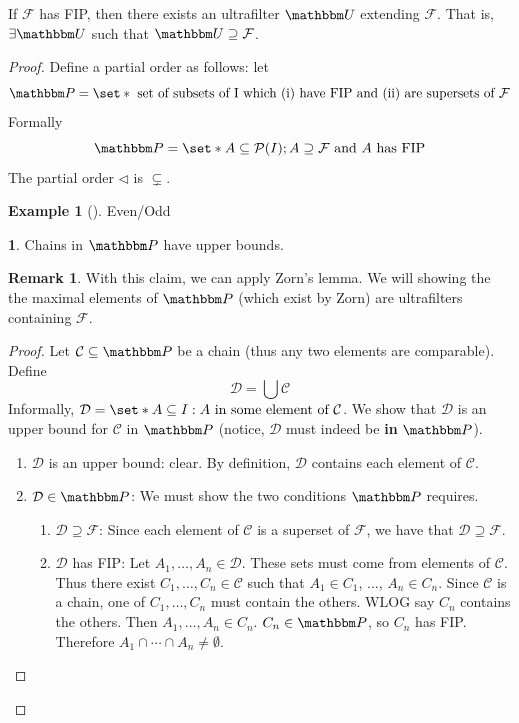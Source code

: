 \documentclass[11pt]{article}
\numberwithin{equation}{section}
\newcounter{theo}[section]\setcounter{theo}{0}
\theoremstyle{definition}
\newtheorem{claim}{\color{ForestGreen}{\textbf{Claim}}}[section]
\theoremstyle{definition}
\newtheorem{example}{\color{WildStrawberry}Example}[section]
\newtheorem*{remark}{Remark}
\def\Set{\set*}%
\def\sse{\subseteq}
\def\imp{\Rightarrow}
\newcommand{\1}{\mathbbm 1}
\newcommand{\PP}{\mathbbm P}
\newcommand{\UU}{\mathbbm U}
\newcommand{\pP}{\mathcal P}
\newcommand{\cC}{\mathcal C}
\newcommand{\dD}{\mathcal D}
\newcommand{\fF}{\mathcal F}
\begin{document}
\begin{theorem}[FIP $\imp$ ultrafilter extension]\label{thm:fipextension}
	If $\fF$ has FIP, then there exists an ultrafilter $\UU$ extending $\fF$. That is, $\exists \UU$ such that $\UU \supseteq \fF$. 
\end{theorem}
\begin{proof}
	Define a partial order as follows: let \[\PP = \Set{ \text{ set of subsets of I which (i) have FIP and (ii) are supersets of $\fF$}}\] 
	Formally
	\begin{equation}
		\PP = \Set{A \sse \pP(I); A \supseteq \fF \text{ and $A$ has FIP}}
	\end{equation}
	The partial order $\triangleleft$ is $\subsetneq$. 

	\begin{example}[]
		Even/Odd

	\end{example}

	\begin{claim}
		Chains in $\PP$ have upper bounds. 
	\end{claim}
	\begin{remark}
		With this claim, we can apply Zorn's lemma. We will showing the the maximal elements of $\PP$ (which exist by Zorn) are ultrafilters containing $\fF$.
	\end{remark}
	
	\begin{proof}
		Let $\cC \sse \PP$ be a chain (thus any two elements are comparable). Define
		\begin{equation}
			\dD = \bigcup \cC 
		\end{equation}
		Informally, $\dD = \Set{A \sse I: A \text{ in some element of } \cC}$. We show that $\dD$ is an upper bound for $\cC$ in $\PP$ (notice, $\dD$ must indeed be \textbf{in} $\PP$). 
		\begin{enumerate}
			\item $\dD$ is an upper bound: clear. By definition, $\dD$ contains each element of $\cC$. 
			\item $\dD \in \PP$: We must show the two conditions $\PP$ requires. 
			\begin{enumerate}
				\item $\dD \supseteq \fF$: Since each element of $\cC$ is a superset of $\fF$, we have that $\dD \supseteq \fF$. 
				\item $\dD$ has FIP: Let $A_1,\ldots,A_n \in \dD$. These sets must come from elements of $\cC$. Thus there exist $C_1,\ldots,C_n \in \cC$ such that $A_1 \in C_1$, $\ldots$, $A_n \in C_n$. Since $\cC$ is a chain, one of $C_1,\ldots,C_n$ must contain the others. WLOG say $C_n$ contains the others. Then $A_1,\ldots,A_n \in C_n$. $C_n \in \PP$, so $C_n$ has FIP. Therefore $A_1 \cap \cdots \cap A_n \neq \emptyset$. 
			\end{enumerate}
		\end{enumerate}
	\end{proof}
	

\end{proof}
\end{document}
